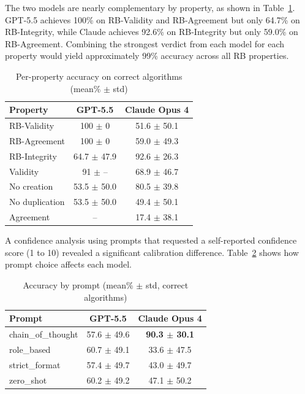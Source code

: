 \documentclass[conference]{IEEEtran}
\begin{document}
The two models are nearly complementary by property, as shown in Table~\ref{tab:model-prop}. GPT-5.5 achieves 100\% on RB-Validity and RB-Agreement but only 64.7\% on RB-Integrity, while Claude achieves 92.6\% on RB-Integrity but only 59.0\% on RB-Agreement. Combining the strongest verdict from each model for each property would yield approximately 99\% accuracy across all RB properties.

\begin{table}[h]
\centering
\caption{Per-property accuracy on correct algorithms (mean\% $\pm$ std)}
\label{tab:model-prop}
\begin{tabular}{|l|c|c|}
\hline
\textbf{Property} & \textbf{GPT-5.5} & \textbf{Claude Opus 4} \\
\hline
RB-Validity & 100 $\pm$ 0 & 51.6 $\pm$ 50.1 \\
RB-Agreement & 100 $\pm$ 0 & 59.0 $\pm$ 49.3 \\
RB-Integrity & 64.7 $\pm$ 47.9 & 92.6 $\pm$ 26.3 \\
Validity & 91 $\pm$ -- & 68.9 $\pm$ 46.7 \\
No creation & 53.5 $\pm$ 50.0 & 80.5 $\pm$ 39.8 \\
No duplication & 53.5 $\pm$ 50.0 & 49.4 $\pm$ 50.1 \\
Agreement & -- & 17.4 $\pm$ 38.1 \\
\hline
\end{tabular}
\end{table}

A confidence analysis using prompts that requested a self-reported confidence score (1 to 10) revealed a significant calibration difference. Table~\ref{tab:prompt-model} shows how prompt choice affects each model.

\begin{table}[h]
\centering
\caption{Accuracy by prompt (mean\% $\pm$ std, correct algorithms)}
\label{tab:prompt-model}
\begin{tabular}{|l|c|c|}
\hline
\textbf{Prompt} & \textbf{GPT-5.5} & \textbf{Claude Opus 4} \\
\hline
chain\_of\_thought & 57.6 $\pm$ 49.6 & \textbf{90.3 $\pm$ 30.1} \\
role\_based & 60.7 $\pm$ 49.1 & 33.6 $\pm$ 47.5 \\
strict\_format & 57.4 $\pm$ 49.7 & 43.0 $\pm$ 49.7 \\
zero\_shot & 60.2 $\pm$ 49.2 & 47.1 $\pm$ 50.2 \\
\hline
\end{tabular}
\end{table}
\end{document}
